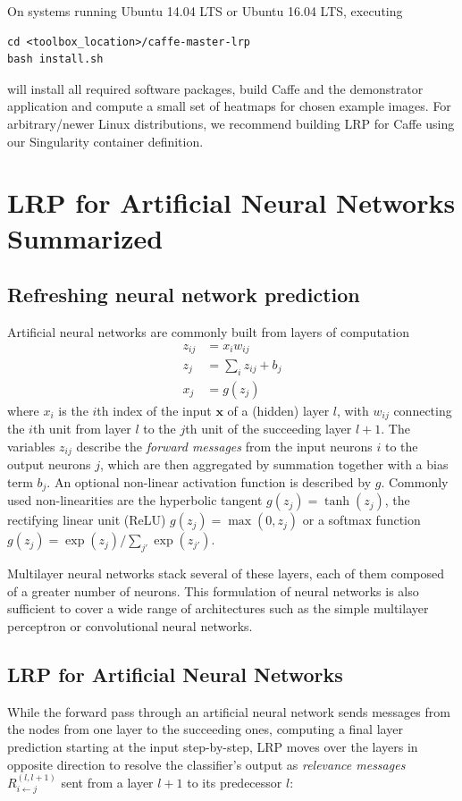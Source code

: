 \documentclass[a4wide]{article}
\newcommand{\x}{\boldsymbol{x}}
\begin{document}
On systems running Ubuntu 14.04 LTS or Ubuntu 16.04 LTS, executing
\begin{Verbatim}[frame = single]
cd <toolbox_location>/caffe-master-lrp
bash install.sh
\end{Verbatim}
will install all required software packages, build Caffe and the demonstrator application and compute a small set of heatmaps for chosen example images.
For arbitrary/newer Linux distributions, we recommend building LRP for Caffe using our Singularity container definition.

\section{LRP for Artificial Neural Networks Summarized}
\label{sec:lrp}

\subsection*{Refreshing neural network prediction}
Artificial neural networks are commonly built from layers of computation
\begin{align}
z_{ij} &  =  x_iw_{ij} \\
z_j & =  \sum\limits_i z_{ij} + b_j\\
x_j & =  g(z_j)
\end{align}
where $x_i$ is the $i$th index of the input $\x$ of a (hidden) layer $l$, with $w_{ij}$ connecting the $i$th unit from layer $l$ to the $j$th unit of the succeeding layer $l+1$.
The variables $z_{ij}$ describe the \emph{forward messages} from the input neurons $i$ to the output neurons $j$, which are then aggregated by summation together with a bias term $b_j$.
An optional non-linear activation function is described by $g$.
Commonly used non-linearities are the hyperbolic tangent $g(z_j) = \tanh(z_j)$, the rectifying linear unit (ReLU) $g(z_j) = \max(0,z_j)$ or a softmax function $g(z_j) = \exp(z_j)/\sum_{j'}\exp(z_{j'})$.

 Multilayer neural networks stack several of these layers, each of them composed of a greater number of neurons. This formulation of neural networks is also sufficient to cover a wide range of architectures such as the simple multilayer perceptron or convolutional neural networks.

\subsection*{LRP for Artificial Neural Networks}
While the forward pass through an artificial neural network sends messages from the nodes from one layer to the succeeding ones, computing a final layer prediction starting at the input step-by-step, LRP moves over the layers in opposite direction to resolve the classifier's output as \emph{relevance messages} $R^{(l,l+1)}_{i\leftarrow j}$ sent from a layer $l+1$ to its predecessor $l$:
\end{document}
